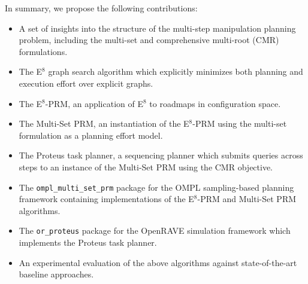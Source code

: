 In summary,
we propose the following contributions:
\begin{itemize}
\item A set of insights into the structure of the
   multi-step manipulation planning problem,
   including the multi-set and comprehensive multi-root (CMR)
   formulations.
\item The E$^8$ graph search algorithm which explicitly minimizes
   both planning and execution effort over explicit graphs.
\item The E$^8$-PRM, an application of E$^8$ to roadmaps in
   configuration space.
\item The Multi-Set PRM, an instantiation of the E$^8$-PRM
   using the multi-set formulation as a planning effort model.
\item The {\sc Proteus} task planner,
   a sequencing planner which submits queries across steps
   to an instance of the Multi-Set PRM using the CMR objective.
\item The {\tt ompl\_multi\_set\_prm} package
   for the OMPL \cite{sucan2012ompl} sampling-based planning framework
   containing implementations of the E$^8$-PRM and Multi-Set PRM
   algorithms.
\item The {\tt or\_proteus} package for the
   OpenRAVE \cite{diankov2010openrave} simulation framework
   which implements the {\sc Proteus} task planner.
\item An experimental evaluation of the above algorithms against
   state-of-the-art baseline approaches.
\end{itemize}

